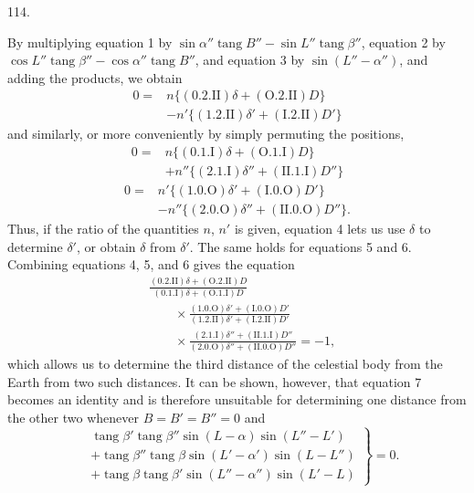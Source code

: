 \par{}\medskip
\hypertarget{native-159-article114}{}
\begin{center}114.\end{center}
By multiplying equation 1 by $\sin\alpha''\operatorname{tang}B''-\sin L''\operatorname{tang}\beta''$, equation 2 by $\cos L''\operatorname{tang}\beta''-\cos\alpha''\operatorname{tang}B''$, and equation 3 by $\sin(L''-\alpha'')$, and adding the products, we obtain
\[
\begin{aligned}
0={}&n\{(0.2.\mathrm{II})\delta+(\mathrm{O}.2.\mathrm{II})D\}\\
&-n'\{(1.2.\mathrm{II})\delta'+(\mathrm{I}.2.\mathrm{II})D'\}
\end{aligned}\tag*{4)}
\]
and similarly, or more conveniently by simply permuting the positions,
\[
\begin{aligned}
0={}&n\{(0.1.\mathrm{I})\delta+(\mathrm{O}.1.\mathrm{I})D\}\\
&+n''\{(2.1.\mathrm{I})\delta''+(\mathrm{II}.1.\mathrm{I})D''\}
\end{aligned}\tag*{5)}
\]
\[
\begin{aligned}
0={}&n'\{(1.0.\mathrm{O})\delta'+(\mathrm{I}.0.\mathrm{O})D'\}\\
&-n''\{(2.0.\mathrm{O})\delta''+(\mathrm{II}.0.\mathrm{O})D''\}.
\end{aligned}\tag*{6)}
\]
Thus, if the ratio of the quantities $n$, $n'$ is given, equation 4 lets us use $\delta$ to determine $\delta'$, or obtain $\delta$ from $\delta'$. The same holds for equations 5 and 6. Combining equations 4, 5, and 6 gives the equation
\[
\begin{aligned}
&\frac{(0.2.\mathrm{II})\delta+(\mathrm{O}.2.\mathrm{II})D}{(0.1.\mathrm{I})\delta+(\mathrm{O}.1.\mathrm{I})D}\\[.6em]
&\qquad\times\frac{(1.0.\mathrm{O})\delta'+(\mathrm{I}.0.\mathrm{O})D'}{(1.2.\mathrm{II})\delta'+(\mathrm{I}.2.\mathrm{II})D'}\\[.6em]
&\qquad\times\frac{(2.1.\mathrm{I})\delta''+(\mathrm{II}.1.\mathrm{I})D''}{(2.0.\mathrm{O})\delta''+(\mathrm{II}.0.\mathrm{O})D''}=-1,
\end{aligned}\tag*{7)}
\]
which allows us to determine the third distance of the celestial body from the Earth from two such distances. It can be shown, however, that equation 7 becomes an identity and is therefore unsuitable for determining one distance from the other two whenever $B=B'=B''=0$ and
\[
\left.\begin{aligned}
&\operatorname{tang}\beta'\operatorname{tang}\beta''\sin(L-\alpha)\sin(L''-L')\\
&+\operatorname{tang}\beta''\operatorname{tang}\beta\sin(L'-\alpha')\sin(L-L'')\\
&+\operatorname{tang}\beta\operatorname{tang}\beta'\sin(L''-\alpha'')\sin(L'-L)
\end{aligned}\right\}=0.
\]
